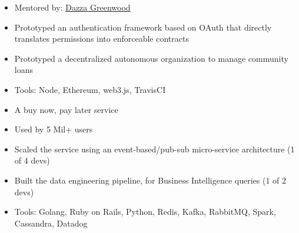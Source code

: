 \documentclass[11pt,a4paper,sans]{moderncv}
\begin{document}
{
    \begin{itemize}
    \item Mentored by: \href{https://web.media.mit.edu/~dang/}{Dazza Greenwood}
    \item Prototyped an authentication framework based on OAuth that directly
    translates permissions into enforceable contracts
    \item Prototyped a decentralized autonomous organization to manage community
        loans
    \item Tools: Node, Ethereum, web3.js, TravisCI
    \end{itemize}
}

{
    \begin{itemize}
    \item A buy now, pay later service
    \item Used by 5 Mil+ users
    \item Scaled the service using an event-based/pub-sub micro-service
    architecture (1 of 4 devs)
    \item Built the data engineering pipeline, for Business Intelligence queries
    (1 of 2 devs)
    \item Tools: Golang, Ruby on Rails, Python, Redis, Kafka, RabbitMQ, Spark,
    Cassandra, Datadog
    \end{itemize}
}

\end{document}
